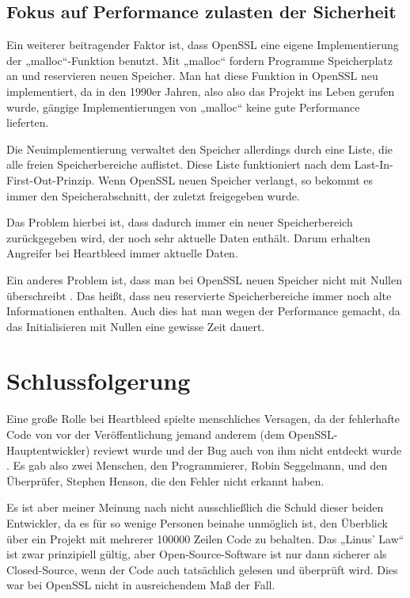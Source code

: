 \documentclass[12pt]{article}
\begin{document}
\subsection{Fokus auf Performance zulasten der Sicherheit}

Ein weiterer beitragender Faktor ist, dass OpenSSL eine eigene Implementierung der „malloc“-Funktion benutzt. Mit „malloc“ fordern Programme Speicherplatz an und reservieren neuen Speicher. Man hat diese Funktion in OpenSSL neu implementiert, da in den 1990er Jahren, also also das Projekt ins Leben gerufen wurde, gängige Implementierungen von „malloc“ keine gute Performance lieferten. 

Die Neuimplementierung verwaltet den Speicher allerdings durch eine Liste, die alle freien Speicherbereiche auflistet. Diese Liste funktioniert nach dem Last-In-First-Out-Prinzip. Wenn OpenSSL neuen Speicher verlangt, so bekommt es immer den Speicherabschnitt, der zuletzt freigegeben wurde. \citep{unangst_heartbleed_2014}

Das Problem hierbei ist, dass dadurch immer ein neuer Speicherbereich zurückgegeben wird, der noch sehr aktuelle Daten enthält. Darum erhalten Angreifer bei Heartbleed immer aktuelle Daten. \citep{higgins_did_2014}

Ein anderes Problem ist, dass man bei OpenSSL neuen Speicher nicht mit Nullen überschreibt \citep{lopez_how_2014}. Das heißt, dass neu reservierte Speicherbereiche immer noch alte Informationen enthalten. Auch dies hat man wegen der Performance gemacht, da das Initialisieren mit Nullen eine gewisse Zeit dauert.

\section{Schlussfolgerung}

Eine große Rolle bei Heartbleed spielte menschliches Versagen, da der fehlerhafte Code von vor der Veröffentlichung jemand anderem (dem OpenSSL-Hauptentwickler) reviewt wurde und der Bug auch von ihm nicht entdeckt wurde \citep{timson_who_2014}. Es gab also zwei Menschen, den Programmierer, Robin Seggelmann, und den Überprüfer, Stephen Henson, die den Fehler nicht erkannt haben. 

Es ist aber meiner Meinung nach nicht ausschließlich die Schuld dieser beiden Entwickler, da es für so wenige Personen beinahe unmöglich ist, den Überblick über ein Projekt mit mehrerer 100000 Zeilen Code zu behalten. Das „Linus' Law“ ist zwar prinzipiell gültig, aber Open-Source-Software ist nur dann sicherer als Closed-Source, wenn der Code auch tatsächlich gelesen und überprüft wird. Dies war bei OpenSSL nicht in ausreichendem Maß der Fall.
\end{document}
